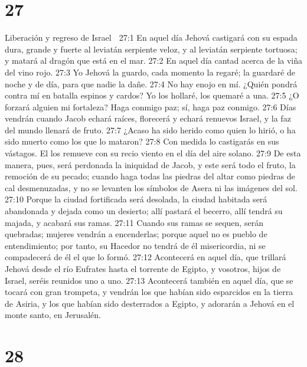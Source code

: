 \chapter{27}

Liberación y regreso de Israel  

27:1 En aquel día Jehová castigará con su espada dura, grande y fuerte al leviatán serpiente veloz, y al leviatán serpiente tortuosa; y matará al dragón que está en el mar.  
27:2 En aquel día cantad acerca de la viña del vino rojo.  
27:3 Yo Jehová la guardo, cada momento la regaré; la guardaré de noche y de día, para que nadie la dañe.  
27:4 No hay enojo en mí. ¿Quién pondrá contra mí en batalla espinos y cardos? Yo los hollaré, los quemaré a una.  
27:5 ¿O forzará alguien mi fortaleza? Haga conmigo paz; sí, haga paz conmigo.  
27:6 Días vendrán cuando Jacob echará raíces, florecerá y echará renuevos Israel, y la faz del mundo llenará de fruto.  
27:7 ¿Acaso ha sido herido como quien lo hirió, o ha sido muerto como los que lo mataron?  
27:8 Con medida lo castigarás en sus vástagos. El los remueve con su recio viento en el día del aire solano.  
27:9 De esta manera, pues, será perdonada la iniquidad de Jacob, y este será todo el fruto, la remoción de su pecado; cuando haga todas las piedras del altar como piedras de cal desmenuzadas, y no se levanten los símbolos de Asera ni las imágenes del sol.  
27:10 Porque la ciudad fortificada será desolada, la ciudad habitada será abandonada y dejada como un desierto; allí pastará el becerro, allí tendrá su majada, y acabará sus ramas.  
27:11 Cuando sus ramas se sequen, serán quebradas; mujeres vendrán a encenderlas; porque aquel no es pueblo de entendimiento; por tanto, su Hacedor no tendrá de él misericordia, ni se compadecerá de él el que lo formó.  
27:12 Acontecerá en aquel día, que trillará Jehová desde el río Eufrates hasta el torrente de Egipto, y vosotros, hijos de Israel, seréis reunidos uno a uno.  
27:13 Acontecerá también en aquel día, que se tocará con gran trompeta, y vendrán los que habían sido esparcidos en la tierra de Asiria, y los que habían sido desterrados a Egipto, y adorarán a Jehová en el monte santo, en Jerusalén.  

\chapter{28}

